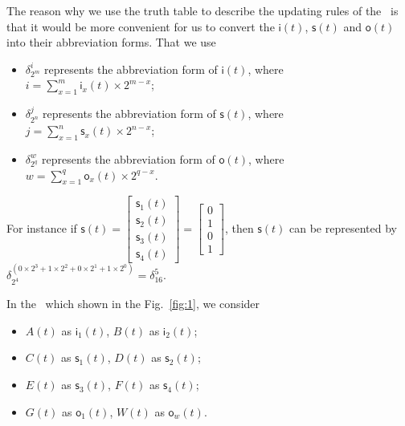 The reason why we use the truth table to describe the updating rules of the \BCN\ is that it would be more convenient for us to convert the $\mathsf{i}(t)$, $\mathsf{s}(t)$ and $\mathsf{o}(t)$ into their abbreviation forms. 
That we use 
\begin{itemize}
  \item $\delta^i_{2^m}$ represents the abbreviation form of $\mathsf{i}(t)$, where $i=\sum_{x=1}^m \mathsf{i}_{x}(t)\times 2^{m-x}$;
  \item $\delta^j_{2^n}$ represents the abbreviation form of $\mathsf{s}(t)$, where $j=\sum_{x=1}^n \mathsf{s}_{x}(t)\times 2^{n-x}$;
  \item $\delta^w_{2^q}$ represents the abbreviation form of $\mathsf{o}(t)$, where  $w=\sum_{x=1}^q \mathsf{o}_{x}(t)\times 2^{q-x}$.
\end{itemize}

For instance if $\mathsf{s}(t)=\begin{bmatrix}\mathsf{s}_1(t)\\\mathsf{s}_2(t) \\ \mathsf{s}_3(t) \\\mathsf{s}_4(t)\end{bmatrix}=\begin{bmatrix}0\\1\\0\\1\end{bmatrix}$, then $\mathsf{s}(t)$ can be represented by $\delta^{(0\times2^3+1\times2^2+0\times2^1+1\times2^0)}_{2^4}=\delta^5_{16}$. 

In the \BCN\ which shown in the Fig.~\ref{fig:1}, we consider 
\begin{itemize}
  \item $A(t)$ as $\mathsf{i}_{1}(t)$, $B(t)$ as $\mathsf{i}_{2}(t)$;
  \item $C(t)$ as $\mathsf{s}_{1}(t)$, $D(t)$ as $\mathsf{s}_{2}(t)$;
  \item $E(t)$ as $\mathsf{s}_{3}(t)$, $F(t)$ as $\mathsf{s}_{4}(t)$;
  \item $G(t)$ as $\mathsf{o}_{1}(t)$, $W(t)$ as $\mathsf{o}_{w}(t)$.
\end{itemize}

